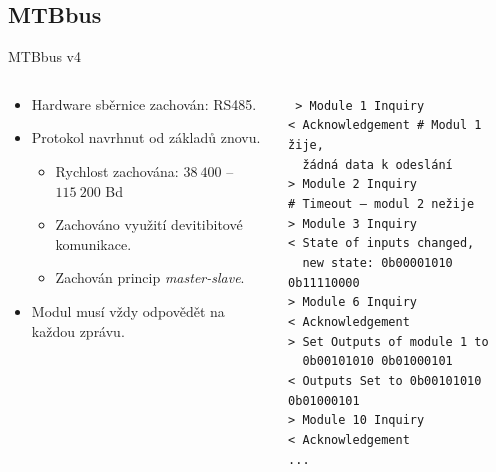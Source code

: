 \documentclass[aspectratio=169]{beamer}
\begin{document}

\subsection{MTBbus}

\begin{frame}{MTBbus v4}
\begin{columns}
	\begin{column}{.5\textwidth}
		\begin{itemize}
		\item Hardware sběrnice zachován: RS485.
		\item Protokol navrhnut od základů znovu.
		\begin{itemize}
			\item Rychlost zachována: $38\ 400$ – $115\ 200$ Bd
			\item Zachováno využití devitibitové komunikace.
			\item Zachován princip \textit{master-slave}.
		\end{itemize}
		\item Modul musí vždy odpovědět na každou zprávu.
		\end{itemize}
	\end{column}
	\pause
	\begin{column}{.5\textwidth}\texttt{\footnotesize
> Module 1 Inquiry \\
< Acknowledgement  \# Modul 1 žije, \\
  žádná data k odeslání \\
> Module 2 Inquiry \\
\# Timeout – modul 2 nežije \\
> Module 3 Inquiry \\
< State of inputs changed, \\
  new state: 0b00001010 0b11110000 \\
> Module 6 Inquiry \\
< Acknowledgement \\
> Set Outputs of module 1 to\\
  0b00101010 0b01000101 \\
< Outputs Set to 0b00101010 0b01000101 \\
> Module 10 Inquiry \\
< Acknowledgement \\
...}
	\end{column}
\end{columns}
\end{frame}
\end{document}
